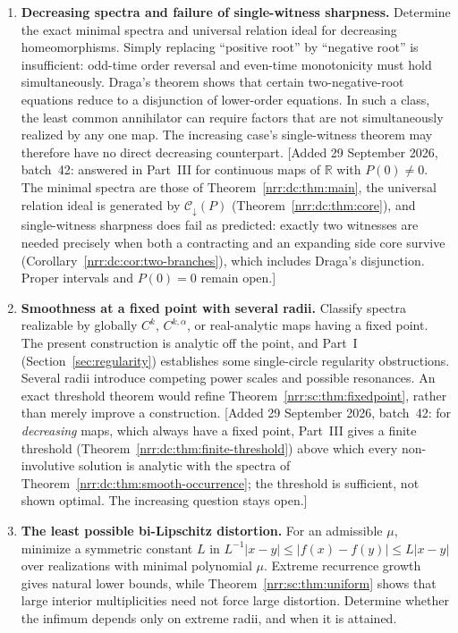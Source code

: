 \documentclass[11pt,letterpaper]{article}
\theoremstyle{definition}
\theoremstyle{remark}
\newcommand{\R}{\mathbb R}
\newcommand{\dcore}{\mathcal C_{\downarrow}}
\begin{document}
\begin{enumerate}[label=\textbf{Q\arabic*.},leftmargin=3.2em,itemsep=0.8em]
\item \textbf{Decreasing spectra and failure of single-witness sharpness.}
Determine the exact minimal spectra and universal relation ideal for
decreasing homeomorphisms. Simply replacing ``positive root'' by
``negative root'' is insufficient: odd-time order reversal and even-time
monotonicity must hold simultaneously. Draga's theorem \cite{D2016}
shows that certain two-negative-root equations reduce to a disjunction
of lower-order equations. In such a class, the least common annihilator
can require factors that are not simultaneously realized by any one map.
The increasing case's single-witness theorem may therefore have no
direct decreasing counterpart.
[Added 29 September 2026, batch~42: answered in Part~III for continuous maps
of $\R$ with $P(0)\ne0$. The minimal spectra are those of
Theorem~\ref{nrr:dc:thm:main}, the universal relation ideal is generated by
$\dcore(P)$ (Theorem~\ref{nrr:dc:thm:core}), and single-witness sharpness does
fail as predicted: exactly two witnesses are needed precisely when both a
contracting and an expanding side core survive
(Corollary~\ref{nrr:dc:cor:two-branches}), which includes Draga's
disjunction. Proper intervals and $P(0)=0$ remain open.]

\item \textbf{Smoothness at a fixed point with several radii.}
Classify spectra realizable by globally $C^k$, $C^{k,\alpha}$, or
real-analytic maps having a fixed point. The present construction is
analytic off the point, and Part~I (Section~\ref{sec:regularity}) establishes
some single-circle regularity obstructions. Several radii introduce
competing power scales and possible resonances. An exact threshold theorem
would refine Theorem~\ref{nrr:sc:thm:fixedpoint}, rather than merely improve
a construction.
[Added 29 September 2026, batch~42: for \emph{decreasing} maps, which always
have a fixed point, Part~III gives a finite threshold
(Theorem~\ref{nrr:dc:thm:finite-threshold}) above which every non-involutive
solution is analytic with the spectra of
Theorem~\ref{nrr:dc:thm:smooth-occurrence}; the threshold is sufficient, not
shown optimal. The increasing question stays open.]

\item \textbf{The least possible bi-Lipschitz distortion.}
For an admissible $\mu$, minimize a symmetric constant $L$ in
$L^{-1}|x-y|\le|f(x)-f(y)|\le L|x-y|$ over realizations with minimal
polynomial $\mu$. Extreme recurrence growth gives natural lower bounds,
while Theorem~\ref{nrr:sc:thm:uniform} shows that large interior
multiplicities need not force large distortion. Determine whether the
infimum depends only on extreme radii, and when it is attained.


\end{enumerate}
\end{document}
